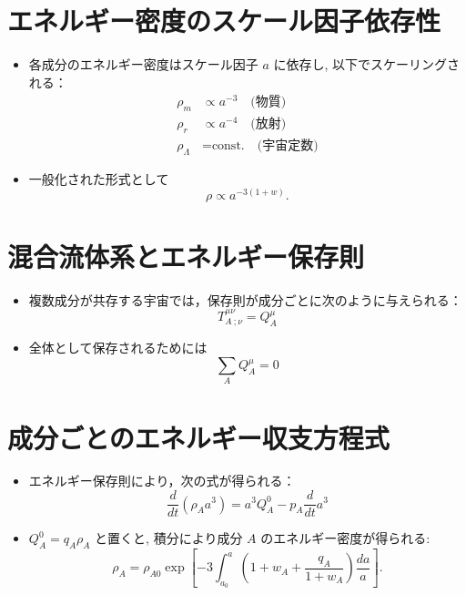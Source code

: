 \documentclass[a4paper,12pt]{article}
\begin{document}
\section*{エネルギー密度のスケール因子依存性}

\begin{itemize}
  \item 各成分のエネルギー密度はスケール因子 $a$ に依存し, 以下でスケーリングされる：
  \begin{align*}
    \rho_m &\propto a^{-3} \quad \text{(物質)} \\
    \rho_r &\propto a^{-4} \quad \text{(放射)} \\
    \rho_\Lambda &= \text{const.} \quad \text{(宇宙定数)}
  \end{align*}
  \item 一般化された形式として
  \begin{equation*}
    \rho \propto a^{-3(1 + w)}.
  \end{equation*}
\end{itemize}

\section*{混合流体系とエネルギー保存則}

\begin{itemize}
  \item 複数成分が共存する宇宙では，保存則が成分ごとに次のように与えられる：
  \begin{equation*}
    T^{\mu\nu}_{A\ ;\nu} = Q_A^\mu
  \end{equation*}
  \item 全体として保存されるためには
  \begin{equation*}
    \sum_A Q_A^\mu = 0
  \end{equation*}
\end{itemize}

\section*{成分ごとのエネルギー収支方程式}

\begin{itemize}
  \item エネルギー保存則により，次の式が得られる：
  \begin{equation*}
    \frac{d}{dt} (\rho_A a^3) = a^3 Q_A^0 - p_A \frac{d}{dt} a^3
  \end{equation*}
  \item $Q_A^0 = q_A \rho_A$ と置くと, 積分により成分 $A$ のエネルギー密度が得られる:
  \begin{equation*}
    \rho_A = \rho_{A0} \exp \left[ -3 \int_{a_0}^{a} \left(1 + w_A + \frac{q_A}{1 + w_A} \right) \frac{da}{a} \right].
  \end{equation*}
\end{itemize}
\end{document}
